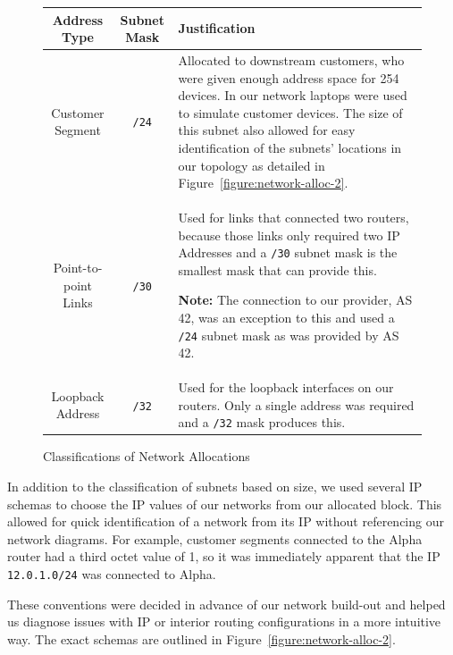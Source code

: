 \begin{figure}[!ht]
    \caption{Classifications of Network Allocations}
    \label{figure:network-alloc-1}
    \centering
    \begin{tabular}{|c|c|p{5.5cm}|}

        \hline
        \textbf{Address Type} & \textbf{Subnet Mask} & \textbf{Justification} \\

        \hline
        Customer Segment & \texttt{/24} & Allocated to downstream customers,
        who were given enough address space for 254 devices. In our network
        laptops were used to simulate customer devices. The size of this subnet
        also allowed for easy identification of the subnets' locations in our
        topology as detailed in Figure~\ref{figure:network-alloc-2}.\\

        \hline
        Point-to-point Links & \texttt{/30} & Used for links that connected two
        routers, because those links only required two IP Addresses and a
        \texttt{/30} subnet mask is the smallest mask that can provide this.
        
        \textbf{Note:} The connection to our provider, AS 42, was an exception
        to this and used a \texttt{/24} subnet mask as was provided by AS 42.\\

        \hline
        Loopback Address & \texttt{/32} & Used for the loopback interfaces on
        our routers. Only a single address was required and a \texttt{/32} mask
        produces this.\\

        \hline
    \end{tabular}
\end{figure}
In addition to the classification of subnets based on size, we used several IP
schemas to choose the IP values of our networks from our allocated block. This
allowed for quick identification of a network from its IP without referencing
our network diagrams. For example, customer segments connected to the Alpha
router had a third octet value of 1, so it was immediately apparent that the IP
\texttt{12.0.1.0/24} was connected to Alpha.

These conventions were decided in advance of our network build-out and helped
us diagnose issues with IP or interior routing configurations in a more
intuitive way. The exact schemas are outlined in Figure~\ref{figure:network-alloc-2}.

